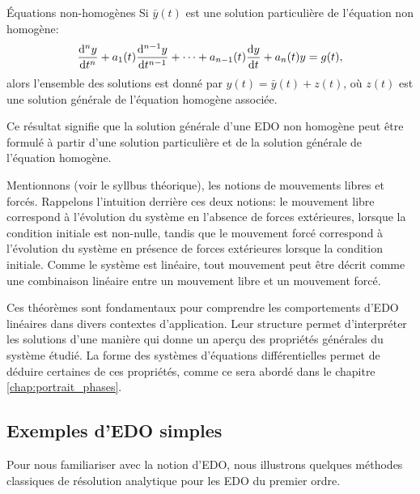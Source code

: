             \begin{theorem}{Équations non-homogènes}  
                Si $\bar{y}(t)$ est une solution particulière de l'équation non homogène:
                \begin{equation}
                \frac {\mathrm d^{n}{y}}{\mathrm d{t}^{n}} + a_1(t)\frac {\mathrm d^{n-1}{y}}{\mathrm d{t}^{n-1}} + \dots + a_{n-1}(t) \frac {\mathrm d{y}}{\mathrm d{t}} + a_n(t)y=g(t),
                \end{equation}
                alors l'ensemble des solutions est donné par $y(t)=\bar{y}(t) + z(t)$, où $z(t)$ est une solution générale de l'équation homogène associée.
            \end{theorem}
            Ce résultat signifie que la solution générale d'une EDO non homogène peut être formulé à partir d'une solution particulière et de la solution générale de l'équation homogène.

            Mentionnons (voir le syllbus théorique), les notions de mouvements libres et forcés. Rappelons l'intuition derrière ces deux notions: le mouvement libre correspond à l'évolution du système en l'absence de forces extérieures, lorsque la condition initiale est non-nulle, tandis que le mouvement forcé correspond à l'évolution du système en présence de forces extérieures lorsque la condition initiale. Comme le système est linéaire, tout mouvement peut être décrit comme une combinaison linéaire entre un mouvement libre et un mouvement forcé.
            
            Ces théorèmes sont fondamentaux pour comprendre les comportements d'EDO linéaires dans divers contextes d'application. Leur structure permet d'interpréter les solutions d'une manière qui donne un aperçu des propriétés générales du système étudié. La forme des systèmes d'équations différentielles permet de déduire certaines de ces propriétés, comme ce sera abordé dans le chapitre \ref{chap:portrait_phases}.

        \subsection{Exemples d'EDO simples}
            Pour nous familiariser avec la notion d'EDO, nous illustrons quelques méthodes classiques de résolution analytique pour les EDO du premier ordre. 

